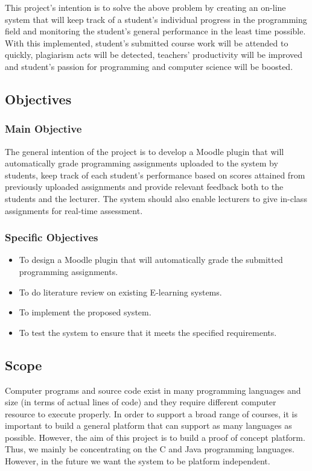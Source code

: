 \documentclass[12pt]{article}
\begin{document}
		This project's intention is to solve the above problem by creating an on-line system that will keep track of a student's individual progress in the programming field and monitoring the student's general performance in the least time possible. With this implemented, student's submitted course work will be attended to quickly, plagiarism acts will be detected, teachers' productivity will be improved and student's passion for programming and computer science will be boosted.
	\subsection{Objectives}
		\subsubsection{Main Objective}
		The general intention of the project is to develop a Moodle plugin that will automatically grade programming assignments uploaded to the system by students, keep track of each student’s performance based on scores attained from previously uploaded assignments and provide relevant feedback both to the students and the lecturer. The system should also enable lecturers to give in-class assignments for real-time assessment.
		\subsubsection{Specific Objectives}
		\begin{itemize}
			\item To design a Moodle plugin that will automatically grade the submitted programming assignments.
			\item To do literature review on existing E-learning systems. 
			\item To implement the proposed system.
			\item To test the system to ensure that it meets the specified requirements.
		\end{itemize}
		
	\subsection{Scope}
		Computer programs and source code exist in many programming languages and size (in terms of actual lines of code) and they require different computer resource to execute properly. In order to support a broad range of courses, it is important to build a general platform that can support as many languages as possible. However, the aim of this project is to build a proof of concept platform. Thus, we mainly be concentrating on the C and Java programming languages.
		However, in the future we want the system to be platform independent. \\
		 
\end{document}

